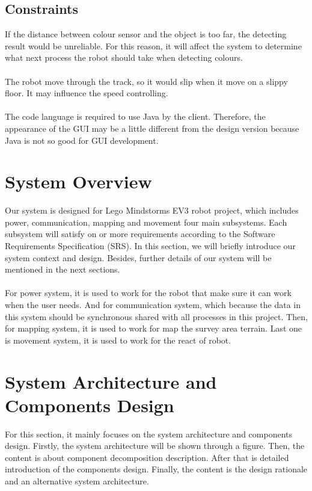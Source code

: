 \documentclass[11pt, a4paper]{article}
\begin{document}
\subsection{Constraints}
If the distance between colour sensor and the object is too far, the detecting result would be unreliable. For this reason, it will affect the system to determine what next process the robot should take when detecting colours.\\
\\
The robot move through the track, so it would slip when it move on a slippy floor. It may influence the speed controlling.\\
\\
The code language is required to use Java by the client. Therefore, the appearance of the GUI may be a little different from the design version because Java is not so good for GUI development.

\section{System Overview}
Our system is designed for Lego Mindstorms EV3 robot project, which includes power, communication, mapping and movement four main subsystems. Each subsystem will satisfy on or more requirements according to the Software Requirements Specification (SRS). In this section, we will briefly introduce our system context and design. Besides, further details of our system will be mentioned in the next sections.\\
\\
For power system, it is used to work for the robot that make sure it can work when the user needs. And for communication system, which because the data in this system should be synchronous shared with all processes in this project. Then, for mapping system, it is used to work for map the survey area terrain. Last one is movement system, it is used to work for the react of robot.

\section{System Architecture and Components Design}
For this section, it mainly focuses on the system architecture and components design. Firstly, the system architecture will be shown through a figure. Then, the content is about component decomposition description. After that is detailed introduction of the components design. Finally, the content is the design rationale and an alternative system architecture.
\end{document}

